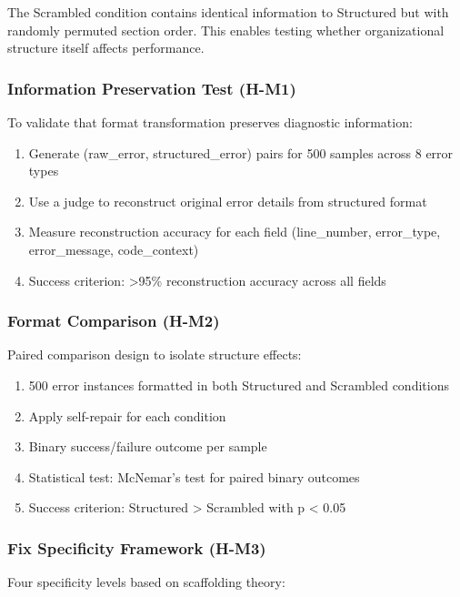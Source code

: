 The Scrambled condition contains identical information to Structured but with randomly permuted section order. This enables testing whether organizational structure itself affects performance.

\subsubsection{Information Preservation Test (H-M1)}

To validate that format transformation preserves diagnostic information:

\begin{enumerate}
\item Generate (raw\_error, structured\_error) pairs for 500 samples across 8 error types
\item Use a judge to reconstruct original error details from structured format
\item Measure reconstruction accuracy for each field (line\_number, error\_type, error\_message, code\_context)
\item Success criterion: >95\% reconstruction accuracy across all fields
\end{enumerate}

\subsubsection{Format Comparison (H-M2)}

Paired comparison design to isolate structure effects:

\begin{enumerate}
\item 500 error instances formatted in both Structured and Scrambled conditions
\item Apply self-repair for each condition
\item Binary success/failure outcome per sample
\item Statistical test: McNemar's test for paired binary outcomes
\item Success criterion: Structured > Scrambled with p < 0.05
\end{enumerate}

\subsubsection{Fix Specificity Framework (H-M3)}

Four specificity levels based on scaffolding theory:


